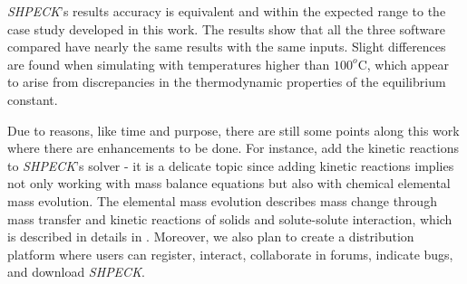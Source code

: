 \emph{SHPECK}'s results accuracy is equivalent and within the expected range to the case study developed in this work. The results show that all the three software compared have nearly the same results with the same inputs. Slight differences are found when simulating with temperatures higher than $100^o$C, which appear to arise from discrepancies in the thermodynamic properties of the equilibrium constant.

Due to reasons, like time and purpose, there are still some points along this work where there are enhancements to be done. For instance, add the kinetic reactions to \emph{SHPECK}'s solver - it is a  delicate topic since adding kinetic reactions implies not only working with mass balance equations but also with chemical elemental mass evolution. The elemental mass evolution describes mass change through mass transfer and kinetic reactions of solids and solute-solute interaction, which is described in details in \cite{Ajpark:14}. Moreover, we also plan to create a distribution platform where users can register, interact, collaborate in forums, indicate bugs, and download \emph{SHPECK}.

